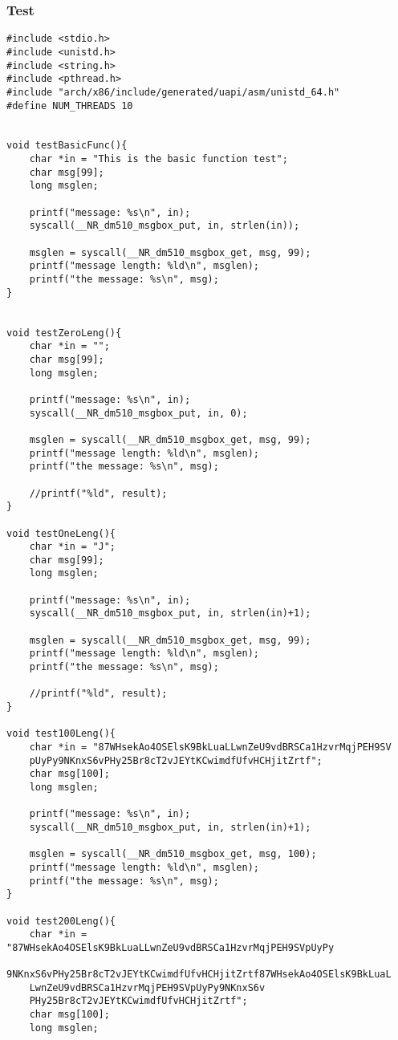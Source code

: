 \documentclass[12pt,a4paper]{report}
\begin{document}
\subsubsection{Test} \label{testCode}
\begin{verbatim}
#include <stdio.h>
#include <unistd.h>
#include <string.h>
#include <pthread.h>
#include "arch/x86/include/generated/uapi/asm/unistd_64.h"
#define NUM_THREADS 10


void testBasicFunc(){
    char *in = "This is the basic function test";
    char msg[99];
    long msglen;

    printf("message: %s\n", in);
    syscall(__NR_dm510_msgbox_put, in, strlen(in));

    msglen = syscall(__NR_dm510_msgbox_get, msg, 99);
    printf("message length: %ld\n", msglen);
    printf("the message: %s\n", msg);
}


void testZeroLeng(){
    char *in = "";
    char msg[99];
    long msglen;

    printf("message: %s\n", in);
    syscall(__NR_dm510_msgbox_put, in, 0);

    msglen = syscall(__NR_dm510_msgbox_get, msg, 99);
    printf("message length: %ld\n", msglen);
    printf("the message: %s\n", msg);

    //printf("%ld", result);
}

void testOneLeng(){
    char *in = "J";
    char msg[99];
    long msglen;

    printf("message: %s\n", in);
    syscall(__NR_dm510_msgbox_put, in, strlen(in)+1);

    msglen = syscall(__NR_dm510_msgbox_get, msg, 99);
    printf("message length: %ld\n", msglen);
    printf("the message: %s\n", msg);

    //printf("%ld", result);
}

void test100Leng(){
    char *in = "87WHsekAo4OSElsK9BkLuaLLwnZeU9vdBRSCa1HzvrMqjPEH9SV
    pUyPy9NKnxS6vPHy25Br8cT2vJEYtKCwimdfUfvHCHjitZrtf";
    char msg[100];
    long msglen;

    printf("message: %s\n", in);
    syscall(__NR_dm510_msgbox_put, in, strlen(in)+1);

    msglen = syscall(__NR_dm510_msgbox_get, msg, 100);
    printf("message length: %ld\n", msglen);
    printf("the message: %s\n", msg);
}

void test200Leng(){
    char *in = "87WHsekAo4OSElsK9BkLuaLLwnZeU9vdBRSCa1HzvrMqjPEH9SVpUyPy
    9NKnxS6vPHy25Br8cT2vJEYtKCwimdfUfvHCHjitZrtf87WHsekAo4OSElsK9BkLuaL
    LwnZeU9vdBRSCa1HzvrMqjPEH9SVpUyPy9NKnxS6v
    PHy25Br8cT2vJEYtKCwimdfUfvHCHjitZrtf";
    char msg[100];
    long msglen;


\end{verbatim}
\end{document}
